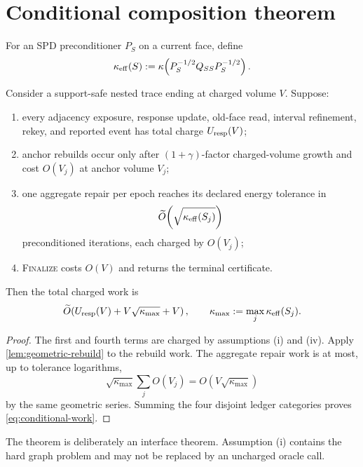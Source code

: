 \section{Conditional composition theorem}
\label{sec:composition}

For an SPD preconditioner $P_S$ on a current face, define
\begin{equation}
 \kappa_{\rm eff}(S)
 :=\kappa\!\left(P_S^{-1/2}Q_{SS}P_S^{-1/2}\right).
 \label{eq:effective-condition}
\end{equation}

\begin{theorem}
\label{thm:conditional-work}
Consider a support-safe nested trace ending at charged volume $V$.  Suppose:

\begin{enumerate}[label=(\roman*)]
\item every adjacency exposure, response update, old-face read, interval
      refinement, rekey, and reported event has total charge
      $U_{\rm resp}(V)$;
\item anchor rebuilds occur only after $(1+\gamma)$-factor charged-volume
      growth and cost $O(V_j)$ at anchor volume $V_j$;
\item one aggregate repair per epoch reaches its declared energy tolerance in
      \[
      \widetilde O\!\left(\sqrt{\kappa_{\rm eff}(S_j)}\right)
      \]
      preconditioned iterations, each charged by $O(V_j)$;
\item \textsc{Finalize} costs $O(V)$ and returns the terminal certificate.
\end{enumerate}

Then the total charged work is
\begin{equation}
 \widetilde O\!\left(
 U_{\rm resp}(V)
 +V\sqrt{\kappa_{\max}}
 +V
 \right),
 \qquad
 \kappa_{\max}:=\max_j\kappa_{\rm eff}(S_j).
 \label{eq:conditional-work}
\end{equation}
\end{theorem}

\begin{proof}
The first and fourth terms are charged by assumptions (i) and (iv).  Apply
\cref{lem:geometric-rebuild} to the rebuild work.  The aggregate repair work is
at most, up to tolerance logarithms,
\[
 \sqrt{\kappa_{\max}}\sum_jO(V_j)
 =O\!\left(V\sqrt{\kappa_{\max}}\right)
\]
by the same geometric series.  Summing the four disjoint ledger categories
proves \cref{eq:conditional-work}.
\end{proof}

The theorem is deliberately an interface theorem.  Assumption (i) contains
the hard graph problem and may not be replaced by an uncharged oracle call.
